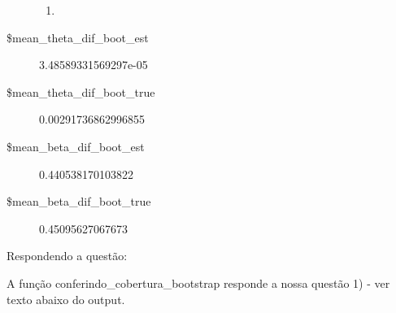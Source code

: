 \documentclass[11pt]{article}
\begin{document}
\begin{description}
\begin{enumerate}
\item {}

\end{enumerate}

\item[\$mean\_theta\_dif\_boot\_est] 3.48589331569297e-05
\item[\$mean\_theta\_dif\_boot\_true] 0.00291736862996855
\item[\$mean\_beta\_dif\_boot\_est] 0.440538170103822
\item[\$mean\_beta\_dif\_boot\_true] 0.45095627067673
\end{description}


    
    Respondendo a questão:

    A função conferindo\_cobertura\_bootstrap responde a nossa questão 1) -
ver texto abaixo do output.
\end{document}
